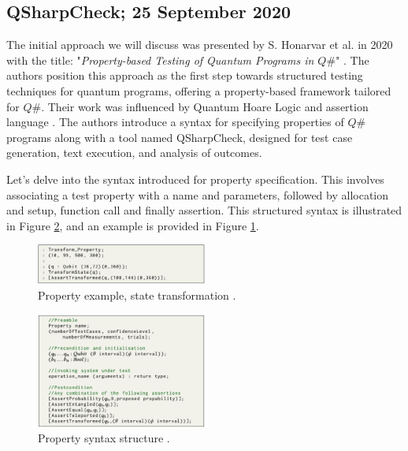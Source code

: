\begin{itemize}
\subsection{QSharpCheck; 25 September 2020}
\label{Ch3.2.1:QSharpCheck}
The initial approach we will discuss was presented by S. Honarvar et al. in 2020 with the title: "\textit{Property-based Testing of Quantum Programs in $Q\#$}" \cite{honarvar2020property}. The authors position this approach as the first step towards structured testing techniques for quantum programs, offering a property-based framework tailored for $Q\#$. Their work was influenced by Quantum Hoare Logic \cite{ying2012floyd} and assertion language \cite{huang2019statistical}. The authors introduce a syntax for specifying properties of $Q\#$ programs along with a tool named QSharpCheck, designed for test case generation, text execution, and analysis of outcomes.\newline

Let's delve into the syntax introduced for property specification. This involves associating a test property with a name and parameters, followed by allocation and setup, function call and finally assertion. This structured syntax is illustrated in Figure \ref{Fig:QSharpSyntax}, and an example is provided in Figure \ref{Fig:QSharpSyntaxEx}.

\vspace{15pt}

\begin{figure}[H]
        \centering
        \includegraphics[width=0.5\textwidth]{TFM/photos/QsharpSyntaxEx.png}
        \caption{Property example, state transformation \cite{honarvar2020property}.} 
        \label{Fig:QSharpSyntaxEx}
\end{figure}

\begin{figure}[H]
        \centering
        \includegraphics[width=0.5\textwidth]{TFM/photos/QsharpSyntax.png}
        \caption{Property syntax structure \cite{honarvar2020property}.} 
        \label{Fig:QSharpSyntax}
\end{figure}



\end{itemize}
